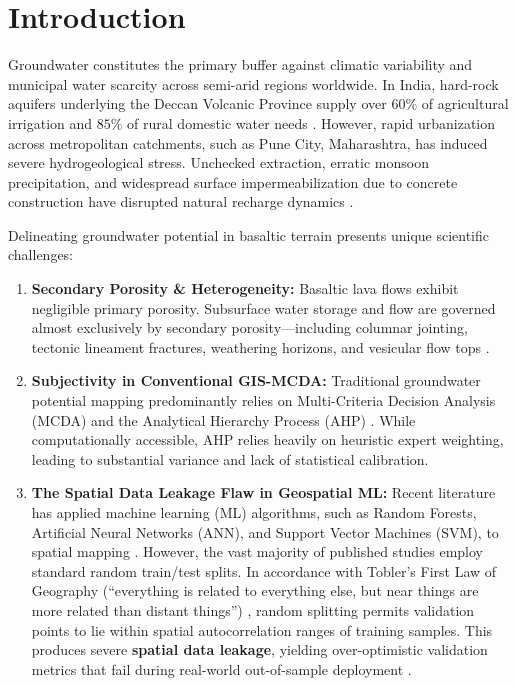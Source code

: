 \documentclass[conference]{IEEEtran}
\begin{document}
\section{Introduction}
Groundwater constitutes the primary buffer against climatic variability and municipal water scarcity across semi-arid regions worldwide. In India, hard-rock aquifers underlying the Deccan Volcanic Province supply over $60\%$ of agricultural irrigation and $85\%$ of rural domestic water needs \cite{foster2007}. However, rapid urbanization across metropolitan catchments, such as Pune City, Maharashtra, has induced severe hydrogeological stress. Unchecked extraction, erratic monsoon precipitation, and widespread surface impermeabilization due to concrete construction have disrupted natural recharge dynamics \cite{cgwb2023}.

Delineating groundwater potential in basaltic terrain presents unique scientific challenges:
\begin{enumerate}
    \item \textbf{Secondary Porosity \& Heterogeneity:} Basaltic lava flows exhibit negligible primary porosity. Subsurface water storage and flow are governed almost exclusively by secondary porosity—including columnar jointing, tectonic lineament fractures, weathering horizons, and vesicular flow tops \cite{limaye2006}.
    \item \textbf{Subjectivity in Conventional GIS-MCDA:} Traditional groundwater potential mapping predominantly relies on Multi-Criteria Decision Analysis (MCDA) and the Analytical Hierarchy Process (AHP) \cite{saaty1980, mallick2018}. While computationally accessible, AHP relies heavily on heuristic expert weighting, leading to substantial variance and lack of statistical calibration.
    \item \textbf{The Spatial Data Leakage Flaw in Geospatial ML:} Recent literature has applied machine learning (ML) algorithms, such as Random Forests, Artificial Neural Networks (ANN), and Support Vector Machines (SVM), to spatial mapping \cite{pradhan2009, bui2019, pourghasemi2018}. However, the vast majority of published studies employ standard random train/test splits. In accordance with Tobler’s First Law of Geography (``everything is related to everything else, but near things are more related than distant things'') \cite{tobler1970}, random splitting permits validation points to lie within spatial autocorrelation ranges of training samples. This produces severe \textbf{spatial data leakage}, yielding over-optimistic validation metrics that fail during real-world out-of-sample deployment \cite{roberts2017}.
\end{enumerate}
\end{document}
